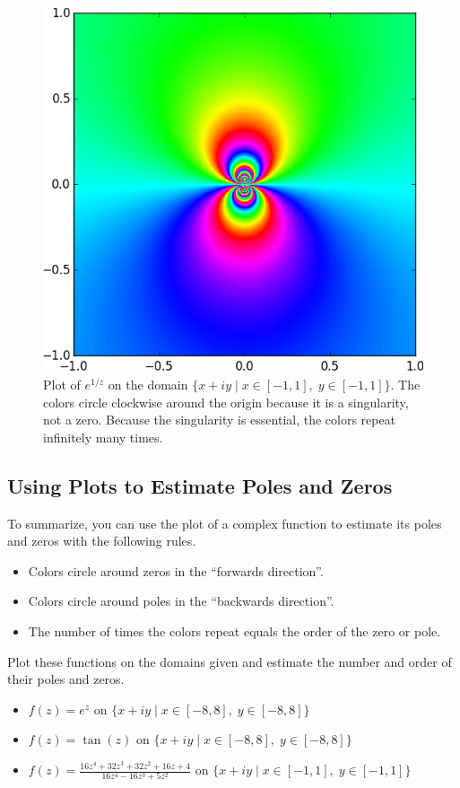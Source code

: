 \begin{figure}
\includegraphics[width=.7\textwidth]{essential_pole.png}
\caption{Plot of $e^{1/z}$ on the domain $\{x+iy \mid x \in [-1,1] , \; y \in [-1,1]\}$.
The colors circle clockwise around the origin because it is a singularity, not a zero.
Because the singularity is essential, the colors repeat infinitely many times.}
\label{fig:essential_singularity}
\end{figure}

\subsection*{Using Plots to Estimate Poles and Zeros}
To summarize, you can use the plot of a complex function to estimate its poles and zeros with the following rules.
\begin{itemize}
\item Colors circle around zeros in the ``forwards direction''.
\item Colors circle around poles in the ``backwards direction''.
\item The number of times the colors repeat equals the order of the zero or pole.
\end{itemize}

\begin{problem}\label{prob:findpz}
Plot these functions on the domains given and estimate the number and order of their poles and zeros.
\begin{itemize}
\item $f(z) = e^z$ on $\{ x+iy \mid x \in [-8,8], \; y \in [-8,8]\}$
\item $f(z) = \tan(z)$ on $\{x+iy \mid x \in [-8,8], \; y \in [-8,8]\}$
\item $f(z) = \frac{16z^4+32z^3+32z^2+16z+4}{16z^4-16z^3+5z^2}$ on $\{x+iy \mid x \in [-1,1], \; y \in [-1,1]\}$
\end{itemize}
\end{problem}

